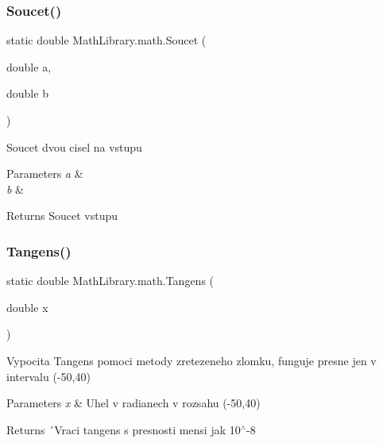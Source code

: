 \subsubsection{\texorpdfstring{Soucet()}{Soucet()}}
{\footnotesize\ttfamily static double Math\+Library.\+math.\+Soucet (\begin{DoxyParamCaption}\item[{double}]{a,  }\item[{double}]{b }\end{DoxyParamCaption})\hspace{0.3cm}{\ttfamily [static]}}



Soucet dvou cisel na vstupu 


\begin{DoxyParams}{Parameters}
{\em a} & \\
\hline
{\em b} & \\
\hline
\end{DoxyParams}
\begin{DoxyReturn}{Returns}
Soucet vstupu
\end{DoxyReturn}
\mbox{\label{class_math_library_1_1math_a389c42a9997236b24c2b0af1c43c625d}} 
\subsubsection{\texorpdfstring{Tangens()}{Tangens()}}
{\footnotesize\ttfamily static double Math\+Library.\+math.\+Tangens (\begin{DoxyParamCaption}\item[{double}]{x }\end{DoxyParamCaption})\hspace{0.3cm}{\ttfamily [static]}}



Vypocita Tangens pomoci metody zretezeneho zlomku, funguje presne jen v intervalu (-\/50,40) 


\begin{DoxyParams}{Parameters}
{\em x} & Uhel v radianech v rozsahu (-\/50,40)\\
\hline
\end{DoxyParams}
\begin{DoxyReturn}{Returns}
´\+Vraci tangens s presnosti mensi jak 10$^\wedge$-\/8
\end{DoxyReturn}
\mbox{\label{class_math_library_1_1math_a4e4be4de44305ffd1bd15db33fb26e3a}} 
